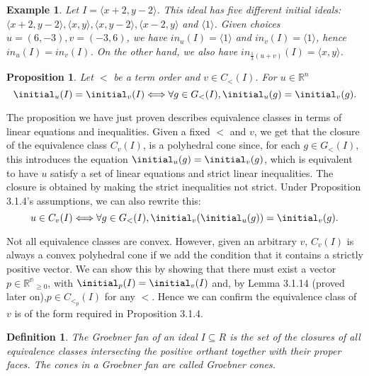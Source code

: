 \documentclass[12pt,a4paper]{report}
\newtheorem{definition}{Definition}
\newtheorem{example}{Example}
\newtheorem{proposition}{Proposition}
\begin{document}
\begin{example}
Let $I = \langle x + 2, y - 2 \rangle$. This ideal has five different initial ideals: $\langle x+2, y-2 \rangle, \langle x,y \rangle, \langle x,y-2 \rangle, \langle x-2,y \rangle$ and $\langle 1 \rangle$. Given choices $u = (6, -3), v = (-3, 6)$, we have $in_{u} (I) = \langle 1 \rangle$ and $in_{v} (I) = \langle 1 \rangle$, hence $in_{u} (I) = in_{v} (I)$. On the other hand, we also have $in_{\frac{1}{3} (u + v)} (I) = \langle x, y \rangle$.
\end{example}

\begin{proposition}
Let $<$ be a term order and $v \in C_{<} (I)$. For $u \in \mathbb{R}^{n}$
\begin{equation*}
  \initial_{u}(I) = \initial_{v}(I) \Longleftrightarrow \forall g \in G_{<} (I), \initial_{u}(g) = \initial_{v}(g).
\end{equation*}
\end{proposition}

The proposition we have just proven describes equivalence classes in terms of linear equations and inequalities. Given a fixed $<$ and $v$, we get that the closure of the equivalence class $C_{v}(I)$, is a polyhedral cone since, for each $g \in G_{<}(I)$, this introduces the equation $\initial_{u}(g) = \initial_{v}(g)$, which is equivalent to have $u$ satisfy a set of linear equations and strict linear inequalities. The closure is obtained by making the strict inequalities not strict. Under Proposition 3.1.4's assumptions, we can also rewrite this:
\begin{equation*}
    u \in C_{v}(I) \Longleftrightarrow \forall g \in G_{<}(I), \initial_{v}(\initial_{u}(g)) = \initial_{v}(g).
\end{equation*}

Not all equivalence classes are convex. However, given an arbitrary $v$, $C_{v} (I)$ is always a convex polyhedral cone if we add the condition that it contains a strictly positive vector. We can show this by showing that there must exist a vector $p \in \mathbb{{R}^{n}} _{\geq 0}$, with $\initial_{p} (I) = \initial_{v} (I)$ and, by Lemma 3.1.14 (proved later on),$p \in C_{{<}_{p}} (I)$ for any $<$. Hence we can confirm the equivalence class of $v$ is of the form required in Proposition 3.1.4.


\begin{definition}
The \emph{Groebner fan} of an ideal $I \subseteq R$ is the set of the closures of all equivalence classes intersecting the positive orthant together with their proper faces. The cones in a Groebner fan are called Groebner cones.  
\end{definition}
\end{document}
